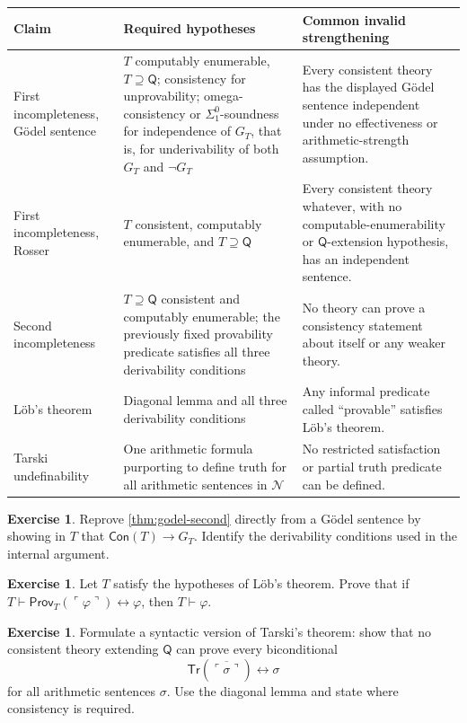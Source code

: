 \documentclass[11pt,oneside,openany]{book}
\theoremstyle{definition}
\newtheorem{exercise}[definition]{Exercise}
\theoremstyle{plain}
\theoremstyle{remark}
\newcommand{\derives}{\vdash}
\begin{document}
\begin{longtable}{@{}p{}p{}p{}@{}}
\toprule
Claim & Required hypotheses & Common invalid strengthening \\
\midrule
\endhead
First incompleteness, G\"odel sentence & \(T\) computably enumerable,
\(T\supseteq\mathsf Q\); consistency for unprovability; omega-consistency or
\(\Sigma^0_1\)-soundness for independence of \(G_T\), that is, for
underivability of both \(G_T\) and \(\neg G_T\) & Every consistent theory
has the displayed G\"odel sentence independent under no effectiveness or
arithmetic-strength assumption. \\
\addlinespace
First incompleteness, Rosser & \(T\) consistent, computably enumerable, and
\(T\supseteq\mathsf Q\) & Every consistent theory whatever, with no
computable-enumerability or \(\mathsf Q\)-extension hypothesis, has an
independent sentence. \\
\addlinespace
Second incompleteness & \(T\supseteq\mathsf Q\) consistent and computably
enumerable; the previously fixed provability predicate satisfies all three
derivability conditions &
No theory can prove a consistency statement about itself or any weaker theory.
\\
\addlinespace
L\"ob's theorem & Diagonal lemma and all three derivability conditions & Any
informal predicate called ``provable'' satisfies L\"ob's theorem. \\
\addlinespace
Tarski undefinability & One arithmetic formula purporting to define truth for
all arithmetic sentences in \(\mathcal N\) & No restricted satisfaction or
partial truth predicate can be defined. \\
\bottomrule
\end{longtable}

\begin{exercise}
\label{ex:second-incompleteness-01}
Reprove \cref{thm:godel-second} directly from a G\"odel sentence by showing in
\(T\) that \(\mathsf{Con}(T)\to G_T\).  Identify the derivability conditions
used in the internal argument.
\end{exercise}

\begin{exercise}
\label{ex:second-incompleteness-02}
Let \(T\) satisfy the hypotheses of L\"ob's theorem.  Prove that if
\(T\derives\mathsf{Prov}_T(\ulcorner\varphi\urcorner)
\leftrightarrow\varphi\), then \(T\derives\varphi\).
\end{exercise}

\begin{exercise}
\label{ex:second-incompleteness-03}
Formulate a syntactic version of Tarski's theorem: show that no consistent
theory extending \(\mathsf Q\) can prove every biconditional
\[
  \mathsf{Tr}(\overline{\ulcorner\sigma\urcorner})
  \leftrightarrow\sigma
\]
for all arithmetic sentences \(\sigma\).  Use the diagonal lemma and state
where consistency is required.
\end{exercise}
\end{document}
